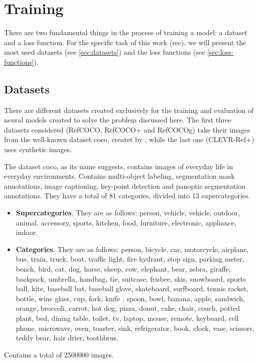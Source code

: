 \section{Training}\label{sec:rec-trainning}

There are two fundamental things in the process of training a model: a dataset
and a loss function. For the specific task of this work (\gls{rec}), we will
present the most used datasets (see \vref{sec:datasets}) and the loss functions
(see \vref{sec:loss-functions}).


\subsection{Datasets}\label{sec:datasets}

There are different datasets created exclusively for the training and
evaluation of neural models created to solve the problem discussed here. The
first three datasets considered (RefCOCO, RefCOCO+ and RefCOCOg) take their
images from the well-known dataset \gls{coco}, createt by
, while the last one (CLEVR-Ref+) uses synthetic images.

The dataset \gls{coco}, as its name suggests, contains images of everyday life
in everyday environments. Contains multi-object labeling, segmentation mask
annotations, image captioning, key-point detection and panoptic segmentation
annotations. They have a total of 81 categories, divided into 13
supercategories.
\begin{itemize}
  \item \textbf{Supercategories}. They are as follows: person, vehicle,
  vehicle, outdoor, animal, accessory, sports, kitchen, food, furniture,
  electronic, appliance, indoor.
  \item \textbf{Categories}. They are as follows: person, bicycle, car,
  motorcycle, airplane, bus, train, truck, boat, traffic light, fire hydrant,
  stop sign, parking meter, bench, bird, cat, dog, horse, sheep, cow, elephant,
  bear, zebra, giraffe, backpack, umbrella, handbag, tie, suitcase, frisbee,
  skis, snowboard, sports ball, kite, baseball bat, baseball glove, skateboard,
  surfboard, tennis racket, bottle, wine glass, cup, fork, knife , spoon, bowl,
  banana, apple, sandwich, orange, broccoli, carrot, hot dog, pizza, donut,
  cake, chair, couch, potted plant, bed, dining table, toilet, tv, laptop,
  mouse, remote, keyboard, cell phone, microwave, oven, toaster, sink,
  refrigerator, book, clock, vase, scissors, teddy bear, hair drier, toothbrus.
\end{itemize}
Contains a total of \num{2500000} images.

